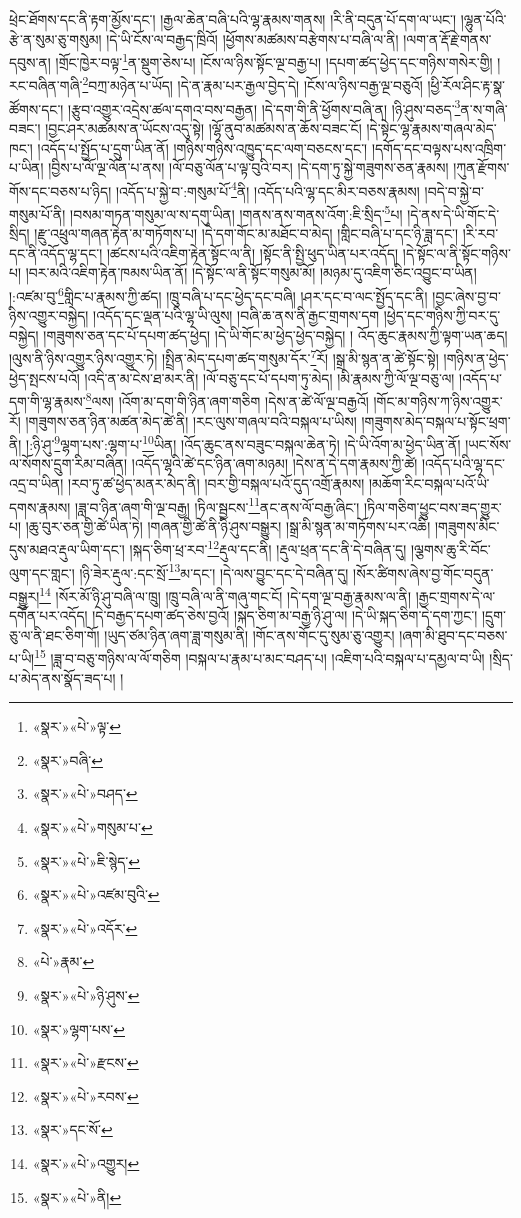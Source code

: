 ཕྲེང་ཐོགས་དང་ནི་རྟག་མྱོས་དང་། །རྒྱལ་ཆེན་བཞི་པའི་ལྷ་རྣམས་གནས། །རི་ནི་བདུན་པོ་དག་ལ་ཡང་། །ལྷུན་པོའི་རྩེ་ན་སུམ་ཅུ་གསུམ། །དེ་ཡི་ངོས་ལ་བརྒྱད་ཁྲིའོ། །ཕྱོགས་མཚམས་བརྩེགས་པ་བཞི་ལ་ནི། །ལག་ན་རྡོ་རྗེ་གནས་དབུས་ན། །གྲོང་ཁྱེར་བལྟ་\footnote{«སྣར་»«པེ་»ལྟ་}ན་སྡུག་ཅེས་པ། །ངོས་ལ་ཉིས་སྟོང་ལྔ་བརྒྱ་པ། །དཔག་ཚད་ཕྱེད་དང་གཉིས་གསེར་གྱི། །རང་བཞིན་གཞི་\footnote{«སྣར་»བཞི་}བཀྲ་མཉེན་པ་ཡོད། །དེ་ན་རྣམ་པར་རྒྱལ་བྱེད་དེ། །ངོས་ལ་ཉིས་བརྒྱ་ལྔ་བཅུའོ། །ཕྱི་རོལ་ཤིང་རྟ་སྣ་ཚོགས་དང་། །རྩུབ་འགྱུར་འདྲེས་ཚལ་དགའ་བས་བརྒྱན། །དེ་དག་གི་ནི་ཕྱོགས་བཞི་ན། །ཉི་ཤུས་བཅད་\footnote{«སྣར་»«པེ་»བཤད་}ན་ས་གཞི་བཟང་། །བྱང་ཤར་མཚམས་ན་ཡོངས་འདུ་སྟེ། །ལྷོ་ནུབ་མཚམས་ན་ཆོས་བཟང་ངོ། །དེ་སྟེང་ལྷ་རྣམས་གཞལ་མེད་ཁང་། །འདོད་པ་སྤྱོད་པ་དྲུག་ཡིན་ནོ། །གཉིས་གཉིས་འཁྱུད་དང་ལག་བཅངས་དང་། །དགོད་དང་བལྟས་པས་འཁྲིག་པ་ཡིན། །བྱིས་པ་ལོ་ལྔ་ལོན་པ་ནས། །ལོ་བཅུ་ལོན་པ་ལྟ་བུའི་བར། །དེ་དག་ཏུ་སྐྱེ་གཟུགས་ཅན་རྣམས། །ཀུན་རྫོགས་གོས་དང་བཅས་པ་ཉིད། །འདོད་པ་སྐྱེ་བ་:གསུམ་པོ་\footnote{«སྣར་»«པེ་»གསུམ་པ་}ནི། །འདོད་པའི་ལྷ་དང་མིར་བཅས་རྣམས། །བདེ་བ་སྐྱེ་བ་གསུམ་པོ་ནི། །བསམ་གཏན་གསུམ་ལ་ས་དགུ་ཡིན། །གནས་ནས་གནས་འོག་:ཇི་སྲིད་\footnote{«སྣར་»«པེ་»ཇི་སྙེད་}པ། །དེ་ནས་དེ་ཡི་གོང་དེ་སྲིད། །རྫུ་འཕྲུལ་གཞན་རྟེན་མ་གཏོགས་པ། །དེ་དག་གོང་མ་མཐོང་བ་མེད། །གླིང་བཞི་པ་དང་ཉི་ཟླ་དང་། །རི་རབ་དང་ནི་འདོད་ལྷ་དང་། །ཚངས་པའི་འཇིག་རྟེན་སྟོང་ལ་ནི། །སྟོང་ནི་སྤྱི་ཕུད་ཡིན་པར་འདོད། །དེ་སྟོང་ལ་ནི་སྟོང་གཉིས་པ། །བར་མའི་འཇིག་རྟེན་ཁམས་ཡིན་ནོ། །དེ་སྟོང་ལ་ནི་སྟོང་གསུམ་མོ། །མཉམ་དུ་འཇིག་ཅིང་འབྱུང་བ་ཡིན། །:འཛམ་བུ་\footnote{«སྣར་»«པེ་»འཛམ་བུའི་}གླིང་པ་རྣམས་ཀྱི་ཚད། །ཁྲུ་བཞི་པ་དང་ཕྱེད་དང་བཞི། །ཤར་དང་བ་ལང་སྤྱོད་དང་ནི། །བྱང་ཞེས་བྱ་བ་ཉིས་འགྱུར་བསྐྱེད། །འདོད་དང་ལྡན་པའི་ལྷ་ཡི་ལུས། །བཞི་ཆ་ནས་ནི་རྒྱང་གྲགས་དག །ཕྱེད་དང་གཉིས་ཀྱི་བར་དུ་བསྐྱེད། །གཟུགས་ཅན་དང་པོ་དཔག་ཚད་ཕྱེད། །དེ་ཡི་གོང་མ་ཕྱེད་ཕྱེད་བསྐྱེད། །
འོད་ཆུང་རྣམས་ཀྱི་ལྟག་ཡན་ཆད། །ལུས་ནི་ཉིས་འགྱུར་ཉིས་འགྱུར་ཏེ། །སྤྲིན་མེད་དཔག་ཚད་གསུམ་དོར་\footnote{«སྣར་»«པེ་»འདོར་}རོ། །སྒྲ་མི་སྙན་ན་ཚེ་སྟོང་སྟེ། །གཉིས་ན་ཕྱེད་ཕྱེད་སྤངས་པའོ། །འདི་ན་མ་ངེས་ཐ་མར་ནི། །ལོ་བཅུ་དང་པོ་དཔག་ཏུ་མེད། །མི་རྣམས་ཀྱི་ལོ་ལྔ་བཅུ་ལ། །འདོད་པ་དག་གི་ལྷ་རྣམས་\footnote{«པེ་»རྣམ་}ལས། །འོག་མ་དག་གི་ཉིན་ཞག་གཅིག །དེས་ན་ཚེ་ལོ་ལྔ་བརྒྱའོ། །གོང་མ་གཉིས་ཀ་ཉིས་འགྱུར་རོ། །གཟུགས་ཅན་ཉིན་མཚན་མེད་ཚེ་ནི། །རང་ལུས་གཞལ་བའི་བསྐལ་པ་ཡིས། །གཟུགས་མེད་བསྐལ་པ་སྟོང་ཕྲག་ནི། །:ཉི་ཤུ་\footnote{«སྣར་»«པེ་»ཉི་ཤུས་}ལྷག་པས་:ལྷག་པ་\footnote{«སྣར་»ལྷག་པས་}ཡིན། །འོད་ཆུང་ནས་བཟུང་བསྐལ་ཆེན་ཏེ། །དེ་ཡི་འོག་མ་ཕྱེད་ཡིན་ནོ། །ཡང་སོས་ལ་སོགས་དྲུག་རིམ་བཞིན། །འདོད་ལྷའི་ཚེ་དང་ཉིན་ཞག་མཉམ། །དེས་ན་དེ་དག་རྣམས་ཀྱི་ཚེ། །འདོད་པའི་ལྷ་དང་འདྲ་བ་ཡིན། །རབ་ཏུ་ཚ་ཕྱེད་མནར་མེད་ནི། །བར་གྱི་བསྐལ་པའོ་དུད་འགྲོ་རྣམས། །མཆོག་རིང་བསྐལ་པའོ་ཡི་དགས་རྣམས། །ཟླ་བ་ཉིན་ཞག་གི་ལྔ་བརྒྱ། །ཏིལ་སྦྱངས་\footnote{«སྣར་»«པེ་»རྫངས་}ནང་ནས་ལོ་བརྒྱ་ཞིང་། །ཏིལ་གཅིག་ཕྱུང་བས་ཟད་གྱུར་པ། །ཆུ་བུར་ཅན་གྱི་ཚེ་ཡིན་ཏེ། །གཞན་གྱི་ཚེ་ནི་ཉི་ཤུས་བསྒྱུར། །སྒྲ་མི་སྙན་མ་གཏོགས་པར་འཆི། །གཟུགས་མིང་དུས་མཐའ་རྡུལ་ཡིག་དང་། །སྐད་ཅིག་ཕྲ་རབ་\footnote{«སྣར་»«པེ་»རབས་}རྡུལ་དང་ནི། །རྡུལ་ཕྲན་དང་ནི་དེ་བཞིན་དུ། །ལྕགས་ཆུ་རི་བོང་ལུག་དང་གླང་། །ཉི་ཟེར་རྡུལ་:དང་སྲོ་\footnote{«སྣར་»དང་སོ་}མ་དང་། །དེ་ལས་བྱུང་དང་དེ་བཞིན་དུ། །སོར་ཚིགས་ཞེས་བྱ་གོང་བདུན་བསྒྱུར།\footnote{«སྣར་»«པེ་»འགྱུར།} །སོར་མོ་ཉི་ཤུ་བཞི་ལ་ཁྲུ། །ཁྲུ་བཞི་ལ་ནི་གཞུ་གང་ངོ། །དེ་དག་ལྔ་བརྒྱ་རྣམས་ལ་ནི། །རྒྱང་གྲགས་དེ་ལ་དགོན་པར་འདོད། །དེ་བརྒྱད་དཔག་ཚད་ཅེས་བྱའོ། །སྐད་ཅིག་མ་བརྒྱ་ཉི་ཤུ་ལ། །དེ་ཡི་སྐད་ཅིག་དེ་དག་ཀྱང་། །དྲུག་ཅུ་ལ་ནི་ཐང་ཅིག་གོ། །ཡུད་ཙམ་ཉིན་ཞག་ཟླ་གསུམ་ནི། །གོང་ནས་གོང་དུ་སུམ་ཅུ་འགྱུར། །ཞག་མི་ཐུབ་དང་བཅས་པ་ཡི།\footnote{«སྣར་»«པེ་»ནི།} །ཟླ་བ་བཅུ་གཉིས་ལ་ལོ་གཅིག །བསྐལ་པ་རྣམ་པ་མང་བཤད་པ། །འཇིག་པའི་བསྐལ་པ་དམྱལ་བ་ཡི། །སྲིད་པ་མེད་ནས་སྣོད་ཟད་པ། །
